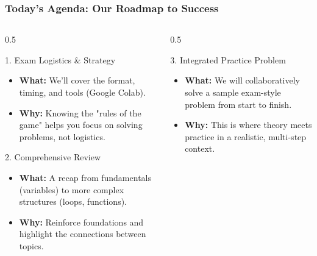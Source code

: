 \documentclass{beamer}
\begin{document}
\begin{frame}[fragile]
    \frametitle{Today's Agenda: Our Roadmap to Success}
    
    \begin{columns}[T] %
        \begin{column}{0.5\textwidth}
            \begin{block}{1. Exam Logistics \& Strategy}
                \begin{itemize}
                    \item \textbf{What:} We'll cover the format, timing, and tools (Google Colab).
                    \item \textbf{Why:} Knowing the "rules of the game" helps you focus on solving problems, not logistics.
                \end{itemize}
            \end{block}
            
            \vspace{1em}
            
            \begin{block}{2. Comprehensive Review}
                \begin{itemize}
                    \item \textbf{What:} A recap from fundamentals (variables) to more complex structures (loops, functions).
                    \item \textbf{Why:} Reinforce foundations and highlight the connections between topics.
                \end{itemize}
            \end{block}
        \end{column}
        
        \begin{column}{0.5\textwidth}
            \begin{block}{3. Integrated Practice Problem}
                \begin{itemize}
                    \item \textbf{What:} We will collaboratively solve a sample exam-style problem from start to finish.
                    \item \textbf{Why:} This is where theory meets practice in a realistic, multi-step context.
                \end{itemize}
            \end{block}
            
            \vspace{1em}
            

\end{column}
\end{columns}
\end{frame}
\end{document}
